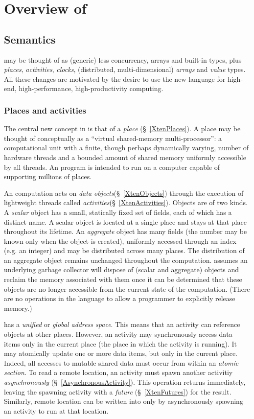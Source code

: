 \chapter{Overview of \Xten}
\section{Semantics}
\Xten{} may be thought of as (generic) \java{} less concurrency, arrays and built-in types,  plus {\em places}, {\em activities}, {\em clocks}, (distributed,
multi-dimensional) {\em arrays} and {\em value} types. All these changes are
motivated by the desire to use the new language for high-end,
high-performance, high-productivity computing.

\subsection{Places and activities}
The central new concept in \Xten{} is that of a {\em place}
(\S~\ref{XtenPlaces}).  A place may be thought of conceptually as a
``virtual shared-memory multi-processor'': a computational unit with a
finite, though perhaps dynamically varying, number of hardware threads
and a bounded amount of shared memory uniformly accessible by all
threads.  An \Xten{} program is intended to run on a computer capable
of supporting millions of places.

An \Xten{} computation acts on {\em data
objects}(\S~\ref{XtenObjects}) through the execution of lightweight
threads called {\em activities}(\S~\ref{XtenActivities}).  Objects are
of two kinds. A {\em scalar} object has a small, statically fixed set
of fields, each of which has a distinct name. A scalar object is
located at a single place and stays at that place throughout its
lifetime.  An {\em aggregate} object has many fields (the number may
be known only when the object is created), uniformly accessed through
an index (e.g.{} an integer) and may be distributed across many
places. The distribution of an aggregate object remains unchanged
throughout the computation. \Xten{} assumes an underlying garbage
collector will dispose of (scalar and aggregate) objects and reclaim
the memory associated with them once it can be determined that these
objects are no longer accessible from the current state of the
computation. (There are no operations in the language to allow a
programmer to explicitly release memory.)

{}\Xten{} has a {\em unified} or {\em global address space}. This
means that an activity can reference objects at other places.
However, an activity may synchronously access data items only in the
current place (the place in which the activity is running). It may
atomically update one or more data items, but only in the current
place.  Indeed, all accesses to mutable shared data must occur from
within an {\em atomic section}. To read a remote location, an activity
must spawn another activitiy {\em asynchronously}
(\S~\ref{AsynchronousActivity}). This operation returns immediately,
leaving the spawning activity with a {\em future}
(\S~\ref{XtenFutures}) for the result. Similarly, remote location can
be written into only by asynchronously spawning an activity to run at
that location.

